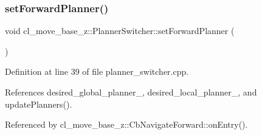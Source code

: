 \subsubsection{\texorpdfstring{set\+Forward\+Planner()}{setForwardPlanner()}}
{\footnotesize\ttfamily void cl\+\_\+move\+\_\+base\+\_\+z\+::\+Planner\+Switcher\+::set\+Forward\+Planner (\begin{DoxyParamCaption}{ }\end{DoxyParamCaption})}



Definition at line 39 of file planner\+\_\+switcher.\+cpp.



References desired\+\_\+global\+\_\+planner\+\_\+, desired\+\_\+local\+\_\+planner\+\_\+, and update\+Planners().



Referenced by cl\+\_\+move\+\_\+base\+\_\+z\+::\+Cb\+Navigate\+Forward\+::on\+Entry().


